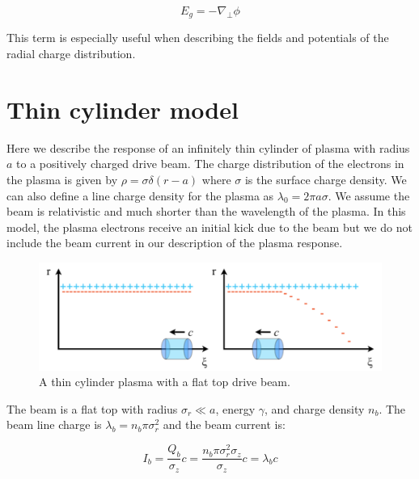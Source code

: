 \documentclass[aps,prl,preprint,groupedaddress]{revtex4-1}
\begin{document}
\begin{equation}\label{eq:E_guass}
E_g = -\nabla_\perp \phi
\end{equation}

This term is especially useful when describing the fields and potentials of the radial charge distribution.

\section{Thin cylinder model}

Here we describe the response of an infinitely thin cylinder of plasma with radius $a$ to a positively charged drive beam. The charge distribution of the electrons in the plasma is given by $\rho = \sigma \delta(r-a)$ where $\sigma$ is the surface charge density. We can also define a line charge density for the plasma as $\lambda_0 = 2\pi a \sigma$. We assume the beam is relativistic and much shorter than the wavelength of the plasma. In this model, the plasma electrons receive an initial kick due to the beam but we do not include the beam current in our description of the plasma response. 


\begin{figure}[ht]\label{fig:thin_cyl}
  \centering
    \includegraphics[width=150mm]{./figures/thin_cyl.pdf}
      \caption{A thin cylinder plasma with a flat top drive beam.}
\end{figure}

The beam is a flat top with radius $\sigma_r \ll a$, energy $\gamma$, and charge density $n_b$. The beam line charge is $\lambda_b = n_b \pi \sigma_r^2$ and the beam current is:

\begin{equation}\label{eq:I_beam}
I_b = \frac{Q_b}{\sigma_z}c = \frac{n_b \pi \sigma_r^2 \sigma_z}{\sigma_z}c = \lambda_b c
\end{equation}
\end{document}

